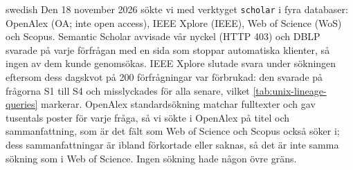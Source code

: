 \begin{onlyin}{swedish}
Den 18 november 2026 sökte vi med verktyget \texttt{scholar} i fyra
databaser: OpenAlex (OA; inte open access), IEEE Xplore (IEEE),
Web of Science (WoS) och Scopus.
Semantic Scholar avvisade vår nyckel (HTTP 403) och DBLP svarade på
varje förfrågan med en sida som stoppar automatiska klienter, så ingen
av dem kunde genomsökas.
IEEE Xplore slutade svara under sökningen eftersom dess dagskvot på 200
förfrågningar var förbrukad: den svarade på frågorna S1 till S4 och
misslyckades för alla senare, vilket \cref{tab:unix-lineage-queries}
markerar.
OpenAlex standardsökning matchar fulltexter och gav tusentals poster för
varje fråga, så vi sökte i OpenAlex på titel och sammanfattning, som är
det fält som Web of Science och Scopus också söker i; dess
sammanfattningar är ibland förkortade eller saknas, så det är inte samma
sökning som i Web of Science.
Ingen sökning hade någon övre gräns.


\end{onlyin}
